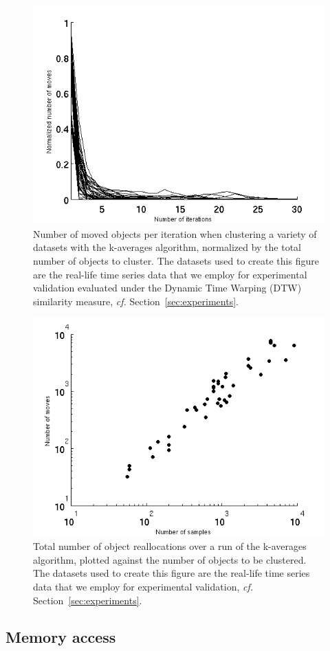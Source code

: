 \documentclass[natbib,smallextended]{svjour3}
\begin{document}
\begin{figure}
\center
\includegraphics[width = .65\textwidth]{figures/iterMove.png}
\caption{Number of moved objects per iteration when clustering a variety of datasets with the k-averages algorithm, normalized by the total number of objects to cluster. The datasets used to create this figure are the real-life time series data that we employ for experimental validation evaluated under the Dynamic Time Warping (DTW) similarity measure, \textit{cf.} Section~\ref{sec:experiments}.}
\label{fig:moved}
\end{figure}

\begin{figure}
\center
\includegraphics[width = .65\textwidth]{figures/sampleMove.png}
\caption{Total number of object reallocations over a run of the k-averages algorithm, plotted against the number of objects to be clustered. The datasets used to create this figure are the real-life time series data that we employ for experimental validation, \textit{cf.} Section~\ref{sec:experiments}.}
\label{fig:totalMoved}
\end{figure}

\subsection{Memory access}
\end{document}
